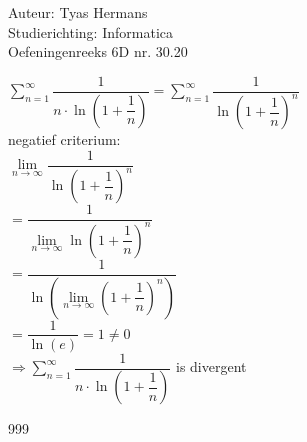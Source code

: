 \documentclass[a4paper]{article}
\newcommand{\SUM}{\displaystyle\sum_{n=1}^{\infty}}
\newcommand{\LIM}{\lim\limits_{n\rightarrow \infty}}
\begin{document}
  
\noindent \large Auteur: Tyas Hermans \\
\noindent \large Studierichting: Informatica\\
\noindent \large Oefeningenreeks 6D nr. 30.20\\

\medskip

\normalsize

$ \SUM \dfrac{1}{n \cdot \ln\left( 1 + \dfrac{1}{n}\right)} = \SUM \dfrac{1}{\ln\left( 1 + \dfrac{1}{n}\right)^n} $ \\

negatief criterium:\\

$ \LIM \dfrac{1}{\ln\left( 1 + \dfrac{1}{n}\right)^n} $ \\

$ = \dfrac{1}{\LIM \ln\left( 1 + \dfrac{1}{n}\right)^n}$ \\

$ = \dfrac{1}{\ln\left(\LIM \left(1 + \dfrac{1}{n}\right)^n\right)} $ \\

$ = \dfrac{1}{\ln(e)} = 1 \neq 0 $ \\

$ \Rightarrow \SUM \dfrac{1}{n \cdot \ln\left( 1 + \dfrac{1}{n}\right)}$ is divergent \\

\begin{thebibliography}{999}
\end{thebibliography}
\end{document}
